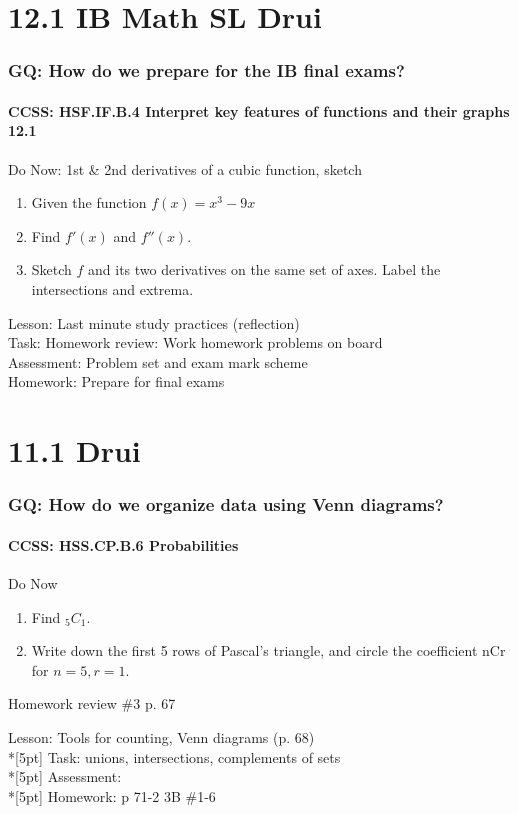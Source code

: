\documentclass{beamer}
\begin{document}
  \section{12.1 IB Math SL Drui}
  \frame
  {
    \frametitle{GQ: How do we prepare for the IB final exams?}
    \framesubtitle{CCSS: HSF.IF.B.4 Interpret key features of functions and their graphs \qquad \alert{12.1}}

    \begin{block}{Do Now: 1st \& 2nd derivatives of a cubic function, sketch}
      \begin{enumerate}
      \item Given the function $f(x)=x^3-9x$
      \item Find $f'(x)$ and $f''(x)$.
      \item Sketch $f$ and its two derivatives on the same set of axes. Label the intersections and extrema.
      \end{enumerate}
   \end{block}
    Lesson: Last minute study practices (reflection) \\[5pt]
    Task: Homework review: Work homework problems on board\\%
    Assessment: Problem set and exam mark scheme\\%
    Homework: Prepare for final exams
  }

  \section{11.1 Drui}
  \frame
  {
    \frametitle{GQ: How do we organize data using Venn diagrams?}
    \framesubtitle{CCSS: HSS.CP.B.6 Probabilities}

    \begin{block}{Do Now}
    \begin{enumerate}
        \item Find $_5C_1$.
        \item Write down the first 5 rows of Pascal's triangle, and circle the coefficient nCr for $n=5, r=1$.
    \end{enumerate}
    Homework review \#3 p. 67
    \end{block}
    Lesson: Tools for counting, Venn diagrams (p. 68)\\*[5pt]
    Task: unions, intersections, complements of sets\\*[5pt]
    Assessment:  \\*[5pt]
    Homework: p 71-2 3B \#1-6
  }
\end{document}
